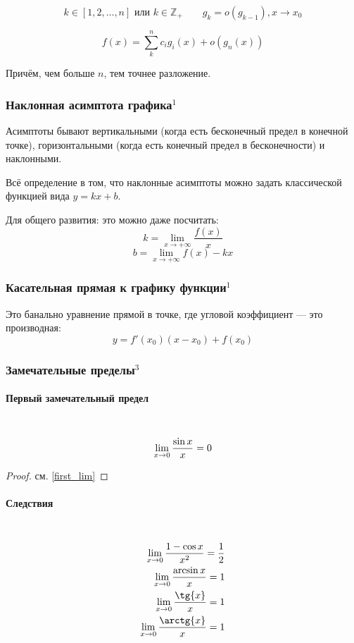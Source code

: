 \documentclass{article}
\let\vanillaparagraph\paragraph
\renewcommand{\paragraph}[1]{\vanillaparagraph{#1}\mbox{}\\}
\begin{document}
\[k \in [1, 2, \ldots, n] \text{ или } k \in \mathbb{Z}_+ \qquad g_k = o(g_{k - 1}), x \rightarrow x_0\]

\[f(x) = \sum_k^n{c_ig_i(x) + o(g_n(x))}\]

Причём, чем больше $n$, тем точнее разложение.

\subsubsection{Наклонная асимптота графика\texorpdfstring{$^1$}{}}
Асимптоты бывают вертикальными (когда есть бесконечный предел в конечной точке), горизонтальными (когда есть конечный предел в бесконечности) и наклонными.

Всё определение в том, что наклонные асимптоты можно задать классической функцией вида $y = kx + b$. 

Для общего развития: это можно даже посчитать: 
$$
k = \lim_{x\rightarrow +\infty} \frac{f(x)}{x}
$$
$$
b = \lim_{x\rightarrow +\infty} f(x) - kx
$$

\subsubsection{Касательная прямая к графику функции\texorpdfstring{$^1$}{}}
Это банально уравнение прямой в точке, где угловой коэффициент --- это производная:
$$
y = f'(x_0)(x - x_0) + f(x_0)
$$

\subsubsection{Замечательные пределы\texorpdfstring{$^3$}{}}
\paragraph{Первый замечательный предел}
\begin{equation}
\lim_{x\to 0} \frac{\sin{x}} {x} = 0 \notag
\end{equation}
\begin{proof}
см. \ref{first_lim}
\end{proof}
\paragraph{Следствия}
\begin{eqnarray}
\lim_{x\to 0} \frac{1 - \cos{x}} {x^2} = \frac{1}{2} \notag\\
\lim_{x\to 0} \frac{\arcsin{x}} {x} = 1 \notag \\
\lim_{x\to 0} \frac{\tg{x}} {x} = 1 \notag \\
\lim_{x\to 0} \frac{\arctg{x}} {x} = 1 \notag
\end{eqnarray}
\end{document}
